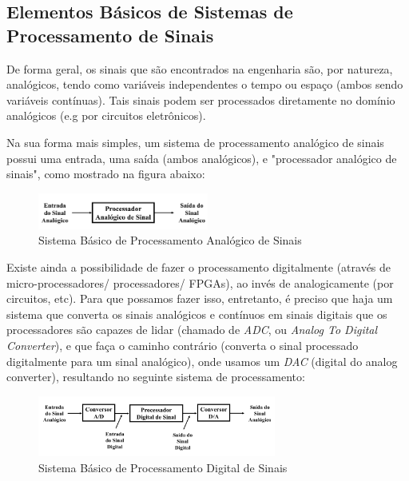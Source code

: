 \documentclass{article}
\begin{document}
\subsection{Elementos Básicos de Sistemas de Processamento de Sinais}
\label{chap:elementos_basicos_processamento_de_sinais}

De forma geral, os sinais que são encontrados na engenharia são, por natureza, analógicos, tendo como variáveis independentes o tempo ou espaço (ambos sendo variáveis contínuas). Tais sinais podem ser processados diretamente no domínio analógicos (e.g por circuitos eletrônicos). 

Na sua forma mais simples, um sistema de processamento analógico de sinais possui uma entrada, uma saída (ambos analógicos), e "processador analógico de sinais", como mostrado na figura abaixo:

\begin{figure}[h!]
    \centering
    \includegraphics[width=0.5\textwidth]{imgs/filtro_analogico.jpeg}
    \caption{Sistema Básico de Processamento Analógico de Sinais}
    \label{fig:enter-label}
\end{figure}

Existe ainda a possibilidade de fazer o processamento digitalmente (através de micro-processadores/ processadores/ FPGAs), ao invés de analogicamente (por circuitos, etc). Para que possamos fazer isso, entretanto, é preciso que haja um sistema que converta os sinais analógicos e contínuos em sinais digitais que os processadores são capazes de lidar (chamado de \emph{ADC}, ou \emph{Analog To Digital Converter}), e que faça o caminho contrário (converta o sinal processado digitalmente para um sinal analógico), onde usamos um \emph{DAC} (digital do analog converter), resultando no seguinte sistema de processamento:
\begin{figure}[h]
    \centering
    \includegraphics[width=0.7\textwidth]{imgs/filtro_digital.jpeg}
    \caption{Sistema Básico de Processamento Digital de Sinais}
    \label{fig:planta_processamento_digital}
\end{figure}
\end{document}
